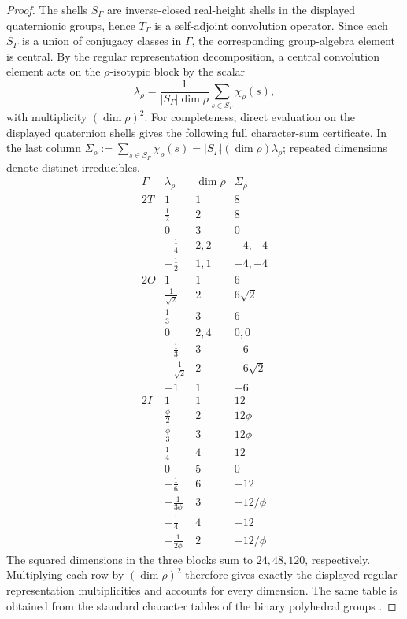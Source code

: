 \documentclass[11pt]{article}
\begin{document}
\begin{proof}
The shells \(S_\Gamma\) are inverse-closed real-height shells in the displayed
quaternionic groups, hence \(T_\Gamma\) is a self-adjoint convolution operator.
Since each \(S_\Gamma\) is a union of conjugacy classes in \(\Gamma\), the
corresponding group-algebra element is central.  By the regular representation
decomposition, a central convolution element acts on the \(\rho\)-isotypic block by
the scalar
\[
    \lambda_\rho
    =
    \frac{1}{|S_\Gamma|\dim\rho}
    \sum_{s\in S_\Gamma}\chi_\rho(s),
\]
with multiplicity \((\dim\rho)^2\).  For completeness, direct evaluation on
the displayed quaternion shells gives the following full character-sum
certificate.  In the last column
\(\Sigma_\rho:=\sum_{s\in S_\Gamma}\chi_\rho(s)
=|S_\Gamma|(\dim\rho)\lambda_\rho\); repeated dimensions denote distinct
irreducibles.
\[
\begin{array}{c|c|c|c}
\Gamma&\lambda_\rho&\dim\rho&\Sigma_\rho\\
\hline
2T&1&1&8\\
&\frac12&2&8\\
&0&3&0\\
&-\frac14&2,2&-4,-4\\
&-\frac12&1,1&-4,-4\\
\hline
2O&1&1&6\\
&\frac1{\sqrt2}&2&6\sqrt2\\
&\frac13&3&6\\
&0&2,4&0,0\\
&-\frac13&3&-6\\
&-\frac1{\sqrt2}&2&-6\sqrt2\\
&-1&1&-6\\
\hline
2I&1&1&12\\
&\frac\phi2&2&12\phi\\
&\frac\phi3&3&12\phi\\
&\frac14&4&12\\
&0&5&0\\
&-\frac16&6&-12\\
&-\frac1{3\phi}&3&-12/\phi\\
&-\frac14&4&-12\\
&-\frac1{2\phi}&2&-12/\phi
\end{array}
\]
The squared dimensions in the three blocks sum to \(24,48,120\),
respectively.  Multiplying each row by \((\dim\rho)^2\) therefore gives
exactly the displayed regular-representation multiplicities and accounts for
every dimension.  The same table is obtained from the standard character
tables of the binary polyhedral groups
\cite{conwaysmith2003quaternions,wolf2011spaces}.
\end{proof}
\end{document}
